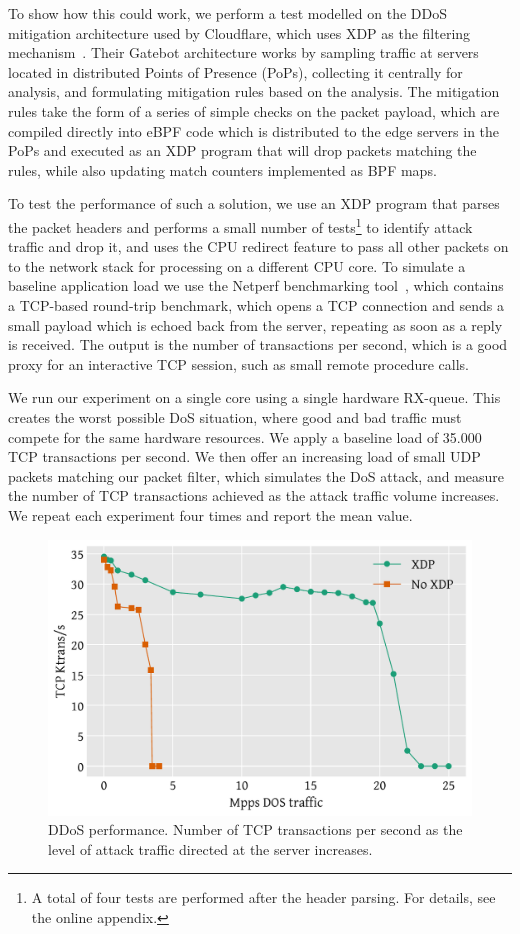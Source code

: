 \documentclass[10pt,sigconf,anonymous]{acmart}
\begin{document}
To show how this could work, we perform a test modelled on the DDoS mitigation
architecture used by Cloudflare, which uses XDP as the filtering
mechanism~\cite{cloudflare-ddos}. Their Gatebot architecture works by sampling
traffic at servers located in distributed Points of Presence (PoPs), collecting
it centrally for analysis, and formulating mitigation rules based on the
analysis. The mitigation rules take the form of a series of simple checks on the
packet payload, which are compiled directly into eBPF code which is distributed
to the edge servers in the PoPs and executed as an XDP program that will drop
packets matching the rules, while also updating match counters implemented as
BPF maps.

To test the performance of such a solution, we use an XDP program that parses
the packet headers and performs a small number of tests\footnote{A total of four
  tests are performed after the header parsing. For details, see the online
  appendix.} to identify attack traffic and drop it, and uses the CPU redirect
feature to pass all other packets on to the network stack for processing on a
different CPU core. To simulate a baseline application load we use the Netperf
benchmarking tool~\cite{netperf}, which contains a TCP-based round-trip
benchmark, which opens a TCP connection and sends a small payload which is
echoed back from the server, repeating as soon as a reply is received. The
output is the number of transactions per second, which is a good proxy for an
interactive TCP session, such as small remote procedure calls.

We run our experiment on a single core using a single hardware RX-queue.  This
creates the worst possible DoS situation, where good and bad traffic must
compete for the same hardware resources. We apply a baseline load of 35.000 TCP
transactions per second. We then offer an increasing load of small UDP packets
matching our packet filter, which simulates the DoS attack, and measure the
number of TCP transactions achieved as the attack traffic volume increases. We
repeat each experiment four times and report the mean value.

\begin{figure}[t]
\centering
\includegraphics[width=\linewidth]{figures/ddos-test.pdf}
\caption{\label{fig:ddos-results} DDoS performance. Number of TCP transactions
  per second as the level of attack traffic directed at the server increases.}
\end{figure}
\end{document}
